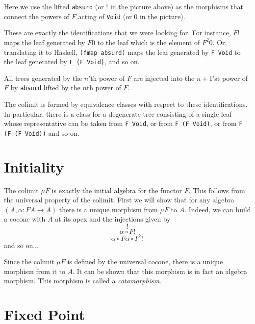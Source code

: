 \documentclass[11pt]{amsart}
\newcommand{\hask}[1]{\texttt{#1}}
\begin{document}
Here we use the lifted \hask{absurd} (or $!$ in the picture above) as the morphisms that connect the powers of $F$ acting of \hask{Void} (or $0$ in the picture). 

These are exactly the identifications that we were looking for. For instance, $F !$ maps the leaf generated by $F 0$ to the leaf which is the element of $F^2 0$. Or, translating it to Haskell, \hask{(fmap absurd)} maps the leaf generated by \hask{F Void} to the leaf generated by \hask{F (F Void)}, and so on. 

All trees generated by the $n$'th power of $F$ are injected into the $n+1$'st power of $F$ by \hask{absurd} lifted by the $n$th power of $F$. 

The colimit is formed by equivalence classes with respect to these identifications. In particular, there is a class for a degenerate tree consisting of a single leaf whose representative can be taken from \hask{F Void}, or from \hask{F (F Void)}, or from \hask{F (F (F Void))} and so on. 

\section{Initiality}

The colimit $\mu F$ is exactly the initial algebra for the functor $F$. This follows from the universal property of the colimit. First we will show that for any algebra $(A, \alpha \colon F A \to A)$ there is a unique morphism from $\mu F$ to $A$. Indeed, we can build a cocone with $A$ at its apex and the injections given by 
\[!\]
\[\alpha \circ F !\]
\[\alpha \circ F \alpha \circ F^2 !\]
and so on...

\begin{figure}[H]
\centering
{}
\end{figure}

Since the colimit $\mu F$ is defined by the universal cocone, there is a unique morphism from it to $A$. It can be shown that this morphism is in fact an algebra morphism. This morphism is called a \textit{catamorphism}.

\section{Fixed Point}
\end{document}
